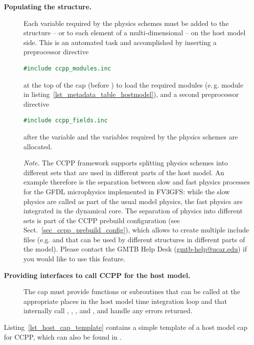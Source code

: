 \begin{description}
\item[\textbf{Populating the  structure.}] Each variable required by the physics schemes must be added to the  structure -- or to each element of a multi-dimensional  -- on the host model side. This is an automated task and accomplished by inserting a preprocessor directive
\begin{lstlisting}[language=Fortran]
#include ccpp_modules.inc
\end{lstlisting}
at the top of the cap (before ) to load the required modules (e.\,g. module  in listing~\ref{lst_metadata_table_hostmodel}), and a second preprocessor directive
\begin{lstlisting}[language=Fortran]
#include ccpp_fields.inc
\end{lstlisting}
after the  variable and the variables required by the physics schemes are allocated.

\emph{Note.} The CCPP framework supports splitting physics schemes into different sets that are used in different parts of the host model. An example therefore is the separation between slow and fast physics processes for the GFDL microphysics implemented in FV3GFS: while the slow physics are called as part of the usual model physics, the fast physics are integrated in the dynamical core. The separation of physics into different sets is part of the CCPP prebuild configuration (see Sect.~\ref{sec_ccpp_prebuild_config}), which allows to create multiple include files (e.g.  and  that can be used by different  structures in different parts of the model). Please contact the GMTB Help Desk (\url{gmtb-help@ucar.edu}) if you would like to use this feature.
\item[\textbf{Providing interfaces to call CCPP for the host model.}] The cap must provide functions or subroutines that can be called at the appropriate places in the host model time integration loop and that internally call , , ,  and , and handle any errors returned.
\end{description}
Listing~\ref{lst_host_cap_template} contains a simple template of a host model cap for CCPP, which can also be found in .
\begin{figure}

\end{figure}\clearpage
